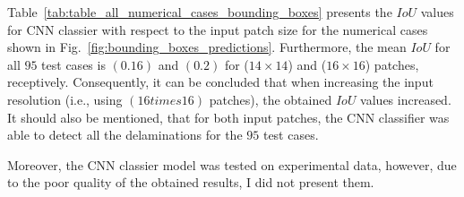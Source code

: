Table~\ref{tab:table_all_numerical_cases_bounding_boxes} presents the \(IoU\) values for CNN classier with respect to the input patch size for the numerical cases shown in Fig.~\ref{fig:bounding_boxes_predictions}.
Furthermore, the mean \(IoU\) for all \(95\) test cases is \((0.16)\) and \((0.2)\) for (\(14\times14\)) and (\(16\times16\)) patches, receptively.
Consequently, it can be concluded that when increasing the input resolution (i.e., using \((16times16)\) patches), the obtained \(IoU\) values increased.
It should also be mentioned, that for both input patches, the CNN classifier was able to detect all the delaminations for the \(95\) test cases.

Moreover, the CNN classier model was tested on experimental data, however, due to the poor quality of the obtained results, I did not present them.

